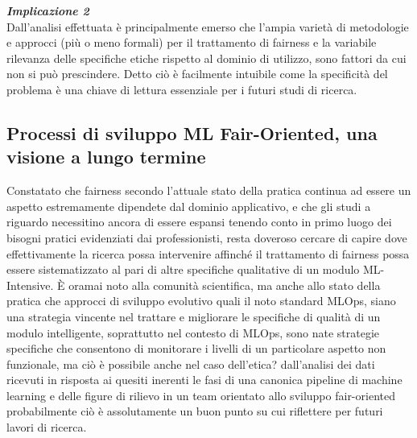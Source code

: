       \begin{center}
	
        \begin{tcolorbox}[width=\textwidth, colframe=black, colback=Gray]
    			\begin{minipage}{\textwidth}
    				\textit{\faCaretSquareORight  \textbf{ Implicazione 2}}\\
    		     Dall'analisi effettuata è principalmente emerso che l'ampia varietà di metodologie e approcci (più o meno formali) per il trattamento di fairness e la variabile rilevanza delle specifiche etiche rispetto al dominio di utilizzo, sono fattori da cui non si può prescindere. Detto ciò è facilmente intuibile come la specificità del problema è una chiave di lettura essenziale per i futuri studi di ricerca.
    			\end{minipage}
		\end{tcolorbox}
	\end{center}
    
    \subsection{Processi di sviluppo ML Fair-Oriented, una visione a lungo termine}
    
    Constatato che fairness secondo l'attuale stato della pratica continua ad essere un aspetto estremamente dipendete dal dominio applicativo, e che gli studi a riguardo necessitino ancora di essere espansi tenendo conto in primo luogo dei bisogni pratici evidenziati dai professionisti, resta doveroso cercare di capire dove effettivamente la ricerca possa intervenire affinché il trattamento di fairness possa essere sistematizzato al pari di altre specifiche qualitative di un modulo ML-Intensive. È oramai noto alla comunità scientifica, ma anche allo stato della pratica che approcci di sviluppo evolutivo quali il noto standard MLOps, siano una strategia vincente nel trattare e migliorare le specifiche di qualità di un modulo intelligente, soprattutto nel contesto di MLOps, sono nate strategie specifiche che consentono di monitorare i livelli di un particolare aspetto non funzionale, ma ciò è possibile anche nel caso dell'etica? dall'analisi dei dati ricevuti in risposta ai quesiti inerenti le fasi di una canonica pipeline di machine learning e delle figure di rilievo in un team orientato allo sviluppo fair-oriented probabilmente ciò è assolutamente un buon punto su cui riflettere per futuri lavori di ricerca. \\
    
